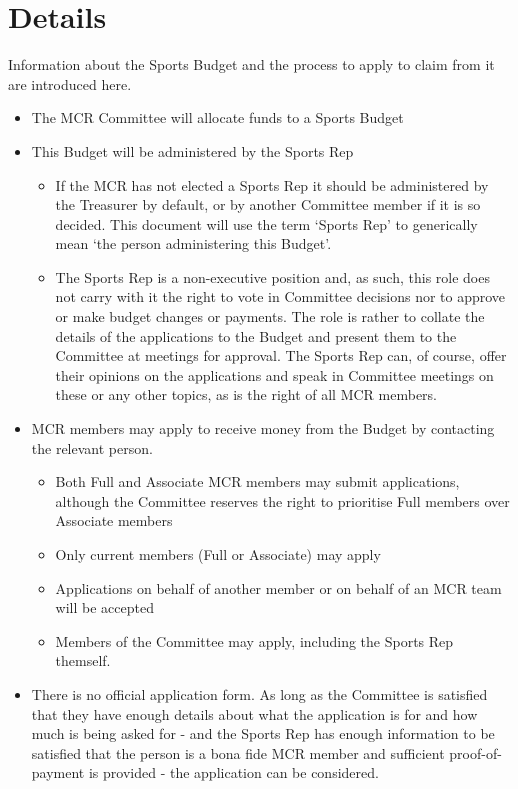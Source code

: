 \section{Details}
Information about the Sports Budget and the process to apply to claim from it are introduced here.
\begin{itemize}
	\item The MCR Committee will allocate funds to a Sports Budget
	\item This Budget will be administered by the Sports Rep
	\begin{itemize}
		\item If the MCR has not elected a Sports Rep it should be administered by the Treasurer by default, or by another Committee member if it is so decided. This document will use the term `Sports Rep' to generically mean `the person administering this Budget'.
		\item The Sports Rep is a non-executive position and, as such, this role does not carry with it the right to vote in Committee decisions nor to approve or make budget changes or payments. The role is rather to collate the details of the applications to the Budget and present them to the Committee at meetings for approval. The Sports Rep can, of course, offer their opinions on the applications and speak in Committee meetings on these or any other topics, as is the right of all MCR members.
	\end{itemize}
	\item MCR members may apply to receive money from the Budget by contacting the relevant person.
	\begin{itemize}
		\item Both Full and Associate MCR members may submit applications, although the Committee reserves the right to prioritise Full members over Associate members
		\item Only current members (Full or Associate) may apply
		\item Applications on behalf of another member or on behalf of an MCR team will be accepted
		\item Members of the Committee may apply, including the Sports Rep themself.
	\end{itemize}
	\item There is no official application form. As long as the Committee is satisfied that they have enough details about what the application is for and how much is being asked for - and the Sports Rep has enough information to be satisfied that the person is a bona fide MCR member and sufficient proof-of-payment is provided - the application can be considered.

\end{itemize}
